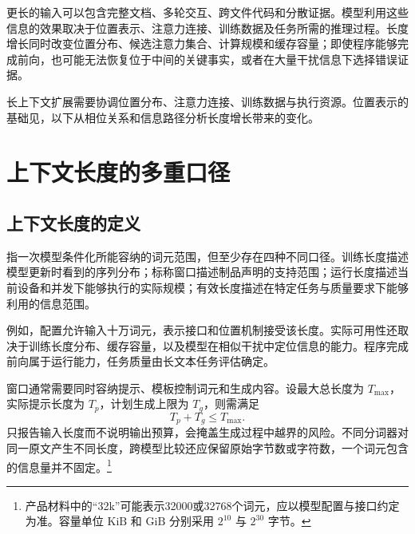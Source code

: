 \documentclass[../textbook.tex]{subfiles}
\begin{document}
\fi
{}

更长的输入可以包含完整文档、多轮交互、跨文件代码和分散证据。模型利用这些信息的效果取决于位置表示、注意力连接、训练数据及任务所需的推理过程。长度增长同时改变位置分布、候选注意力集合、计算规模和缓存容量；即使程序能够完成前向，也可能无法恢复位于中间的关键事实，或者在大量干扰信息下选择错误证据。

长上下文扩展需要协调位置分布、注意力连接、训练数据与执行资源。位置表示的基础见，以下从相位关系和信息路径分析长度增长带来的变化。

\section{上下文长度的多重口径}

\subsection{上下文长度的定义}
指一次模型条件化所能容纳的词元范围，但至少存在四种不同口径。训练长度描述模型更新时看到的序列分布；标称窗口描述制品声明的支持范围；运行长度描述当前设备和并发下能够执行的实际规模；有效长度描述在特定任务与质量要求下能够利用的信息范围。

例如，配置允许输入十万词元，表示接口和位置机制接受该长度。实际可用性还取决于训练长度分布、缓存容量，以及模型在相似干扰中定位信息的能力。程序完成前向属于运行能力，任务质量由长文本任务评估确定。

窗口通常需要同时容纳提示、模板控制词元和生成内容。设最大总长度为 $T_{\max}$，实际提示长度为 $T_p$，计划生成上限为 $T_g$，则需满足
\begin{equation}
 T_p+T_g\le T_{\max}.
\end{equation}
只报告输入长度而不说明输出预算，会掩盖生成过程中越界的风险。不同分词器对同一原文产生不同长度，跨模型比较还应保留原始字节数或字符数，一个词元包含的信息量并不固定。\footnote{产品材料中的“32k”可能表示32000或32768个词元，应以模型配置与接口约定为准。容量单位 $\mathrm{KiB}$ 和 $\mathrm{GiB}$ 分别采用 $2^{10}$ 与 $2^{30}$ 字节。}
\end{document}

